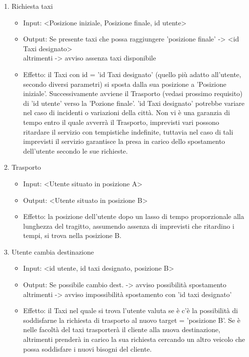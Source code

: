 \begin{enumerate}
	\item Richiesta taxi
		\begin{itemize}
			\item Input:  <Posizione iniziale, Posizione finale, id utente>
			\item Output: Se presente taxi che possa raggiungere 'posizione finale' -> <id Taxi designato> \\
						  altrimenti -> avviso assenza taxi disponibile
			\item Effetto: il Taxi con id = 'id Taxi designato' (quello più adatto all'utente, secondo diversi parametri) si sposta dalla sua posizione a 'Posizione iniziale'. Successivamente avviene il Trasporto (vedasi prossimo requisito) di 'id utente' verso la 'Pozione finale'. 'id Taxi designato' potrebbe variare nel caso di incidenti o variazioni della città. Non vi è una garanzia di tempo entro il quale avverrà il Trasporto, imprevisti vari possono ritardare il servizio con tempistiche indefinite, tuttavia nel caso di tali imprevisti il servizio garantisce la presa in carico dello spostamento dell'utente secondo le sue richieste.
		\end{itemize}

	\item Trasporto
		\begin{itemize}
			\item Input:  <Utente situato in posizione A>
			\item Output: <Utente situato in posizione B>
			\item Effetto: la posizione dell'utente dopo un lasso di tempo proporzionale alla lunghezza del tragitto, assumendo assenza di imprevisti che ritardino i tempi, si trova nella posizione B.
		\end{itemize}

	\item Utente cambia destinazione
		\begin{itemize}
			\item Input: <id utente, id taxi designato, posizione B>
			\item Output: Se possibile cambio dest. -> avviso possibilità spostamento \\
						  altrimenti -> avviso impossibilità spostamento con 'id taxi designato'
			\item Effetto: il Taxi nel quale si trova l'utente valuta se è c'è la possibilità di soddisfarne la richiesta di trasporto al nuovo target = 'posizione B'. Se è nelle facoltà del taxi trasporterà il cliente alla nuova destinazione, altrimenti prenderà in carico la sua richiesta cercando un altro veicolo che possa soddisfare i nuovi bisogni del cliente.
		\end{itemize}
	

\end{enumerate}
